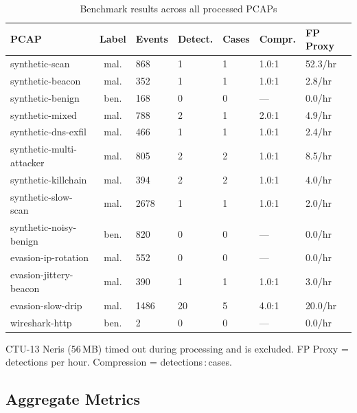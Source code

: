 \documentclass[11pt, a4paper]{article}
\begin{document}
\begin{table}[H]
\centering\small
\caption{Benchmark results across all processed PCAPs}
\label{tab:benchmark}
\begin{tabular}{@{} l c R{1cm} R{1.1cm} R{0.8cm} R{1.4cm} R{1.4cm} @{}}
\toprule
\textbf{PCAP} & \textbf{Label} & \textbf{Events} & \textbf{Detect.} & \textbf{Cases} & \textbf{Compr.} & \textbf{FP Proxy} \\
\midrule
synthetic-scan           & mal. & 868  & 1  & 1 & 1.0:1 & 52.3/hr \\
synthetic-beacon         & mal. & 352  & 1  & 1 & 1.0:1 & 2.8/hr  \\
synthetic-benign         & ben. & 168  & 0  & 0 & ---   & 0.0/hr  \\
synthetic-mixed          & mal. & 788  & 2  & 1 & 2.0:1 & 4.9/hr  \\
synthetic-dns-exfil      & mal. & 466  & 1  & 1 & 1.0:1 & 2.4/hr  \\
synthetic-multi-attacker & mal. & 805  & 2  & 2 & 1.0:1 & 8.5/hr  \\
synthetic-killchain      & mal. & 394  & 2  & 2 & 1.0:1 & 4.0/hr  \\
synthetic-slow-scan      & mal. & 2678 & 1  & 1 & 1.0:1 & 2.0/hr  \\
synthetic-noisy-benign   & ben. & 820  & 0  & 0 & ---   & 0.0/hr  \\
evasion-ip-rotation      & mal. & 552  & 0  & 0 & ---   & 0.0/hr  \\
evasion-jittery-beacon   & mal. & 390  & 1  & 1 & 1.0:1 & 3.0/hr  \\
evasion-slow-drip        & mal. & 1486 & 20 & 5 & 4.0:1 & 20.0/hr \\
wireshark-http           & ben. & 2    & 0  & 0 & ---   & 0.0/hr  \\
\bottomrule
\end{tabular}

\vspace{4pt}
\raggedright\footnotesize
CTU-13 Neris (56\,MB) timed out during processing and is excluded.  FP Proxy = detections per hour. Compression = detections\,:\,cases.
\end{table}

\subsection{Aggregate Metrics}
\end{document}

